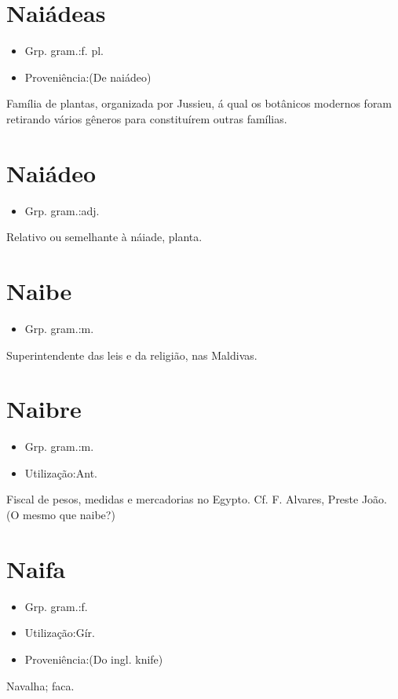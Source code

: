 \section{Naiádeas}
\begin{itemize}
\item {Grp. gram.:f. pl.}
\end{itemize}
\begin{itemize}
\item {Proveniência:(De \textunderscore naiádeo\textunderscore )}
\end{itemize}
Família de plantas, organizada por Jussieu, á qual os botânicos modernos foram retirando vários gêneros para constituírem outras famílias.
\section{Naiádeo}
\begin{itemize}
\item {Grp. gram.:adj.}
\end{itemize}
Relativo ou semelhante à náiade, planta.
\section{Naibe}
\begin{itemize}
\item {Grp. gram.:m.}
\end{itemize}
Superintendente das leis e da religião, nas Maldivas.
\section{Naibre}
\begin{itemize}
\item {Grp. gram.:m.}
\end{itemize}
\begin{itemize}
\item {Utilização:Ant.}
\end{itemize}
Fiscal de pesos, medidas e mercadorias no Egypto. Cf. F. Alvares, \textunderscore Preste João\textunderscore .
(O mesmo que \textunderscore naibe\textunderscore ?)
\section{Naifa}
\begin{itemize}
\item {Grp. gram.:f.}
\end{itemize}
\begin{itemize}
\item {Utilização:Gír.}
\end{itemize}
\begin{itemize}
\item {Proveniência:(Do ingl. \textunderscore knife\textunderscore )}
\end{itemize}
Navalha; faca.
